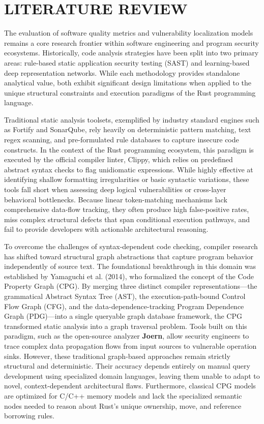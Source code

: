 \chapter{LITERATURE REVIEW}
\hspace{0.5cm}
The evaluation of software quality metrics and vulnerability localization models remains a core research frontier within software engineering and program security ecosystems. Historically, code analysis strategies have been split into two primary areas: rule-based static application security testing (SAST) and learning-based deep representation networks. While each methodology provides standalone analytical value, both exhibit significant design limitations when applied to the unique structural constraints and execution paradigms of the Rust programming language.

Traditional static analysis toolsets, exemplified by industry standard engines such as Fortify and SonarQube, rely heavily on deterministic pattern matching, text regex scanning, and pre-formulated rule databases to capture insecure code constructs. In the context of the Rust programming ecosystem, this paradigm is executed by the official compiler linter, Clippy, which relies on predefined abstract syntax checks to flag unidiomatic expressions. While highly effective at identifying shallow formatting irregularities or basic syntactic variations, these tools fall short when assessing deep logical vulnerabilities or cross-layer behavioral bottlenecks. Because linear token-matching mechanisms lack comprehensive data-flow tracking, they often produce high false-positive rates, miss complex structural defects that span conditional execution pathways, and fail to provide developers with actionable architectural reasoning.

To overcome the challenges of syntax-dependent code checking, compiler research has shifted toward structural graph abstractions that capture program behavior independently of source text. The foundational breakthrough in this domain was established by Yamaguchi et al. (2014), who formalized the concept of the Code Property Graph (CPG). By merging three distinct compiler representations—the grammatical Abstract Syntax Tree (AST), the execution-path-bound Control Flow Graph (CFG), and the data-dependence-tracking Program Dependence Graph (PDG)—into a single queryable graph database framework, the CPG transformed static analysis into a graph traversal problem. Tools built on this paradigm, such as the open-source analyzer \textbf{Joern}, allow security engineers to trace complex data propagation flows from input sources to vulnerable operation sinks. However, these traditional graph-based approaches remain strictly structural and deterministic. Their accuracy depends entirely on manual query development using specialized domain languages, leaving them unable to adapt to novel, context-dependent architectural flaws. Furthermore, classical CPG models are optimized for C/C++ memory models and lack the specialized semantic nodes needed to reason about Rust’s unique ownership, move, and reference borrowing rules.


